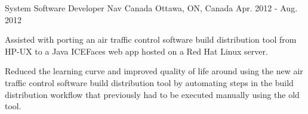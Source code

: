 \begin{cventries}

\cventry
{System Software Developer} %
{Nav Canada} %
{Ottawa, ON, Canada} %
{Apr. 2012 - Aug. 2012} %
{
  \begin{cvitems} %
    \item {
      Assisted with porting an air traffic control software build distribution tool from HP-UX to
      a Java ICEFaces web app hosted on a Red Hat Linux server.
    }
    \item {
      Reduced the learning curve and improved quality of life around using the new air traffic
      control software build distribution tool by automating steps in the build distribution
      workflow that previously had to be executed manually using the old tool.
    }
  \end{cvitems}
}


\end{cventries}
